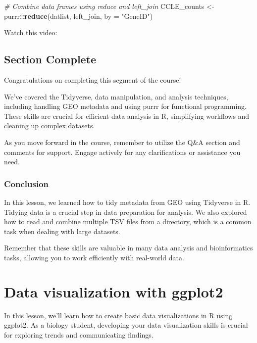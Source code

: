 \documentclass[
]{book}
\newenvironment{Shaded}{\begin{snugshade}}{\end{snugshade}}
\newcommand{\AttributeTok}[1]{\textcolor[rgb]{0.13,0.29,0.53}{#1}}
\newcommand{\CommentTok}[1]{\textcolor[rgb]{0.56,0.35,0.01}{\textit{#1}}}
\newcommand{\FunctionTok}[1]{\textcolor[rgb]{0.13,0.29,0.53}{\textbf{#1}}}
\newcommand{\NormalTok}[1]{#1}
\newcommand{\OtherTok}[1]{\textcolor[rgb]{0.56,0.35,0.01}{#1}}
\newcommand{\SpecialCharTok}[1]{\textcolor[rgb]{0.81,0.36,0.00}{\textbf{#1}}}
\newcommand{\StringTok}[1]{\textcolor[rgb]{0.31,0.60,0.02}{#1}}
\begin{document}
\begin{Shaded}
\begin{Highlighting}[]
\CommentTok{\# Combine data frames using reduce and left\_join}
\NormalTok{CCLE\_counts }\OtherTok{\textless{}{-}}\NormalTok{ purrr}\SpecialCharTok{::}\FunctionTok{reduce}\NormalTok{(datlist, left\_join, }\AttributeTok{by =} \StringTok{"GeneID"}\NormalTok{)}
\end{Highlighting}
\end{Shaded}

Watch this video:

\hypertarget{section-complete-3}{%
\section{Section Complete}\label{section-complete-3}}

Congratulations on completing this segment of the course!

We've covered the Tidyverse, data manipulation, and analysis techniques, including handling GEO metadata and using purrr for functional programming. These skills are crucial for efficient data analysis in R, simplifying workflows and cleaning up complex datasets.

As you move forward in the course, remember to utilize the Q\&A section and comments for support. Engage actively for any clarifications or assistance you need.

\hypertarget{conclusion-21}{%
\subsection{Conclusion}\label{conclusion-21}}

In this lesson, we learned how to tidy metadata from GEO using Tidyverse in R. Tidying data is a crucial step in data preparation for analysis. We also explored how to read and combine multiple TSV files from a directory, which is a common task when dealing with large datasets.

Remember that these skills are valuable in many data analysis and bioinformatics tasks, allowing you to work efficiently with real-world data.

\hypertarget{data-visualization-with-ggplot2}{%
\chapter{Data visualization with ggplot2}\label{data-visualization-with-ggplot2}}

In this lesson, we'll learn how to create basic data visualizations in R using ggplot2. As a biology student, developing your data visualization skills is crucial for exploring trends and communicating findings.
\end{document}
